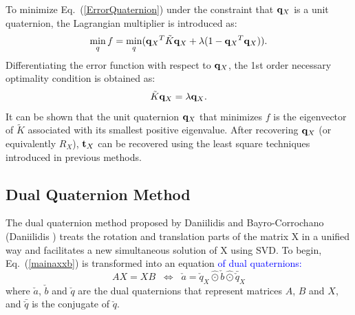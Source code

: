 \documentclass[twocolumn,10pt]{asme2ej}
\newcommand{\ttt}{{\bf t}}
\newcommand{\qq}{{\bf q}}
\begin{document}
To minimize  Eq.~(\ref{ErrorQuaternion}) under the constraint that $\qq_{X}$ is a unit quaternion, the Lagrangian multiplier is introduced as:
\begin{equation}
\min_{q} f = \min_{q}({\qq_{X}}^{T}\tilde{K}{\qq_{X}} + \lambda(1 - {\qq_{X}}^{T}{\qq_{X}})).
\label{ErrorLagrangeMultiplier}
\end{equation}
Differentiating the error function with respect to $\qq_{X}$, the 1st order necessary optimality condition is obtained as: 
\begin{equation}
\tilde{K}\qq_{X} = \lambda \qq_{X}.
\label{QuaternionEig}
\end{equation}
It can be shown that the unit quaternion $\qq_{X}$ that minimizes $f$ is the eigenvector of $\tilde{K}$ associated with its smallest positive eigenvalue. After recovering $\qq_{X}$ (or equivalently $R_{X}$), $\ttt_{X}$ can be recovered using the least square techniques introduced in previous methods.

\subsection{Dual Quaternion Method }
The dual quaternion method proposed by Daniilidis and Bayro-Corrochano \cite{daniilidis1996dual} (Daniilidis \cite{daniilidis1999hand}) treats the rotation and translation parts of the matrix X in a unified way and facilitates a new simultaneous solution of X using SVD. To begin, Eq.~(\ref{mainaxxb}) is transformed into an equation \textcolor{blue}{of dual quaternions:} %
\begin{equation}
AX = XB 
\; \;
\Leftrightarrow
\; \;
\check{a} = \check{q}_{X}\hat{\odot}\check{b}\hat{\odot}\bar{\check{q}}_{X}
\label{DualQuaternion}
\end{equation}
where $\check{a}$, $\check{b}$ and $\check{q}$ are the dual quaternions that represent matrices $A$, $B$ and $X$, and $\bar{\check{q}}$ is the conjugate of $\check{q}$.
\end{document}
